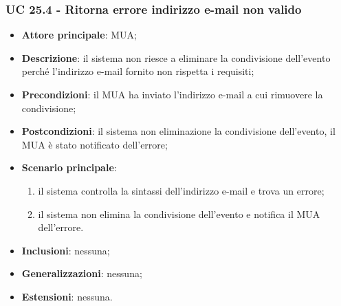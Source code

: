     \subsubsection{UC 25.4 - Ritorna errore indirizzo e-mail non valido} \label{sec:UC25.4}
    \begin{itemize}
        \item \textbf{Attore principale}: MUA;
        \item \textbf{Descrizione}: il sistema non riesce a eliminare la condivisione dell'evento perché l'indirizzo e-mail fornito non rispetta i requisiti;
        \item \textbf{Precondizioni}: il MUA ha inviato l'indirizzo e-mail a cui rimuovere la condivisione;
        \item \textbf{Postcondizioni}: il sistema non eliminazione la condivisione dell'evento, il MUA è stato notificato dell'errore;
        \item \textbf{Scenario principale}:
            \begin{enumerate}
                \item il sistema controlla la sintassi dell'indirizzo e-mail e trova un errore;
                \item il sistema non elimina la condivisione dell'evento e notifica il MUA dell'errore.
            \end{enumerate}
        \item \textbf{Inclusioni}: nessuna;
        \item \textbf{Generalizzazioni}: nessuna;
        \item \textbf{Estensioni}: nessuna.
    \end{itemize}
